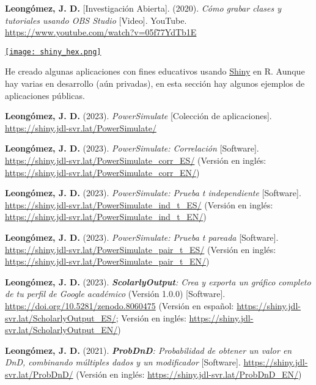 \documentclass[11pt,a4paper,]{awesome-cv}
\begin{document}
\textbf{Leongómez, J. D.} {[}Investigación Abierta{]}. (2020).
\emph{Cómo grabar clases y tutoriales usando OBS Studio} {[}Video{]}.
YouTube. \url{https://www.youtube.com/watch?v=05f77YdTb1E}

\endgroup

\begin{minipage}[c]{0.10\linewidth}
\href{https://jdleongomez.info/es/#shiny}{\texttt{[image: shiny\_hex.png]}}
\end{minipage} \begin{minipage}[c]{0.90\linewidth} \begin{footnotesize}
He creado algunas aplicaciones con fines educativos usando \href{https://shiny.posit.co/}{Shiny} en R. Aunque hay varias en desarrollo (aún privadas), en esta sección hay algunos ejemplos de aplicaciones públicas.
\end{footnotesize}
\end{minipage}

\begingroup
\footnotesize
\setlength{\parindent}{-0.5in}
\setlength{\leftskip}{0.5in}

\textbf{Leongómez, J. D.} (2023). \emph{PowerSimulate} {[}Colección de
aplicaciones{]}. \url{https://shiny.jdl-svr.lat/PowerSimulate/}

\textbf{Leongómez, J. D.} (2023). \emph{PowerSimulate: Correlación}
{[}Software{]}. \url{https://shiny.jdl-svr.lat/PowerSimulate_corr_ES/}
(Versión en inglés:
\url{https://shiny.jdl-svr.lat/PowerSimulate_corr_EN/})

\textbf{Leongómez, J. D.} (2023). \emph{PowerSimulate: Prueba t
independiente} {[}Software{]}.
\url{https://shiny.jdl-svr.lat/PowerSimulate_ind_t_ES/} (Versión en
inglés: \url{https://shiny.jdl-svr.lat/PowerSimulate_ind_t_EN/})

\textbf{Leongómez, J. D.} (2023). \emph{PowerSimulate: Prueba t pareada}
{[}Software{]}. \url{https://shiny.jdl-svr.lat/PowerSimulate_pair_t_ES/}
(Versión en inglés:
\url{https://shiny.jdl-svr.lat/PowerSimulate_pair_t_EN/})

\textbf{Leongómez, J. D.} (2023). \emph{\textbf{ScolarlyOutput}: Crea y
exporta un gráfico completo de tu perfil de Google académico} (Versión
1.0.0) {[}Software{]}.
\href{https://shiny.jdl-svr.lat/ScholarlyOutput_EN/}{https://doi.org/10.5281/zenodo.8060475}
(Versión en español:
\url{https://shiny.jdl-svr.lat/ScholarlyOutput_ES/}; Versión en inglés:
\url{https://shiny.jdl-svr.lat/ScholarlyOutput_EN/})

\textbf{Leongómez, J. D.} (2021). \emph{\textbf{ProbDnD}: Probabilidad
de obtener un valor en DnD, combinando múltiples dados y un modificador}
{[}Software{]}. \url{https://shiny.jdl-svr.lat/ProbDnD/} (Versión en
inglés: \url{https://shiny.jdl-svr.lat/ProbDnD_EN/})
\end{document}
